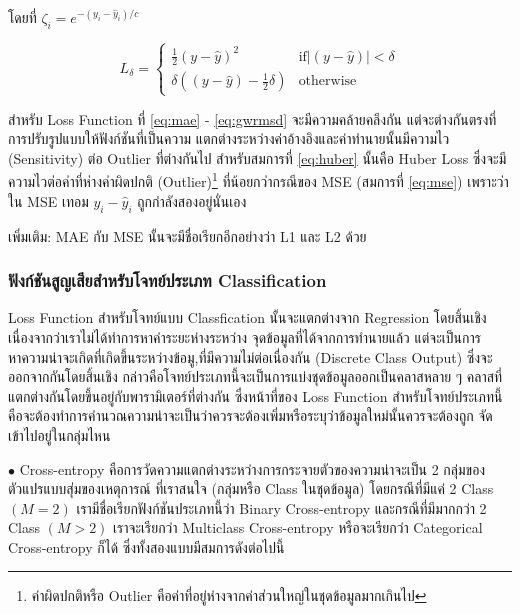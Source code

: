 \noindent โดยที่ $\zeta_{i} = e^{-(y_{i} - \hat{y}_{i}) / c}$

\begin{equation}\label{eq:huber}
    L_{\delta}=
    \left\{\begin{matrix}
        \frac{1}{2}(y - \hat{y})^{2} & \text{if} \left | (y - \hat{y})  \right | < \delta\\
        \delta ((y - \hat{y}) - \frac1 2 \delta) & \text{otherwise}
    \end{matrix}\right.
\end{equation}

สำหรับ Loss Function ที่ \ref{eq:mae} - \ref{eq:gwrmsd} จะมีความคล้ายคลึงกัน แต่จะต่างกันตรงที่การปรับรูปแบบให้ฟังก์ชันที่เป็นความ%
แตกต่างระหว่างค่าอ้างอิงและค่าทำนายนั้นมีความไว (Sensitivity) ต่อ Outlier ที่ต่างกันไป สำหรับสมการที่ \ref{eq:huber} นั้นคือ Huber
Loss ซึ่งจะมีความไวต่อค่าที่ห่างค่าผิดปกติ (Outlier)\footnote{ค่าผิดปกติหรือ Outlier คือค่าที่อยู่ห่างจากค่าส่วนใหญ่ในชุดข้อมูลมากเกินไป} 
ที่น้อยกว่ากรณีของ MSE (สมการที่ \ref{eq:mse}) เพราะว่าใน MSE เทอม $y_{i} - \hat{y}_{i}$ ถูกกำลังสองอยู่นั่นเอง

\noindent เพิ่มเติม: MAE กับ MSE นั้นจะมีชื่อเรียกอีกอย่างว่า L1 และ L2 ด้วย

\subsubsection{ฟังก์ชันสูญเสียสำหรับโจทย์ประเภท Classification}

Loss Function สำหรับโจทย์แบบ Classfication นั้นจะแตกต่างจาก Regression โดยสิ้นเชิงเนื่องจากว่าเราไม่ได้ทำการหาค่าระยะห่างระหว่าง%
จุดข้อมูลที่ได้จากการทำนายแล้ว แต่จะเป็นการหาความน่าจะเกิดที่เกิดขึ้นระหว่างข้อมู,ที่มีความไม่ต่อเนื่องกัน (Discrete Class Output) ซึ่งจะ%
ออกจากกันโดยสิ้นเชิง กล่าวคือโจทย์ประเภทนี้จะเป็นการแบ่งชุดข้อมูลออกเป็นคลาสหลาย ๆ คลาสที่แตกต่างกันโดยขึ้นอยู่กับพารามิเตอร์ที่ต่างกัน 
ซึ่งหน้าที่ของ Loss Function สำหรับโจทย์ประเภทนี้คือจะต้องทำการคำนวณความน่าจะเป็นว่าควรจะต้องเพิ่มหรือระบุว่าข้อมูลใหม่นั้นควรจะต้องถูก%
จัดเข้าไปอยู่ในกลุ่มไหน

\noindent $\bullet$ Cross-entropy คือการวัดความแตกต่างระหว่างการกระจายตัวของความน่าจะเป็น 2 กลุ่มของตัวแปรแบบสุ่มของเหตุการณ์%
ที่เราสนใจ (กลุ่มหรือ Class ในชุดข้อมูล) โดยกรณีที่มีแค่ 2 Class $(M = 2)$ เรามีชื่อเรียกฟังก์ชันประเภทนี้ว่า Binary Cross-entropy 
และกรณีที่มีมากกว่า 2 Class $(M > 2)$ เราจะเรียกว่า Multiclass Cross-entropy หรือจะเรียกว่า Categorical Cross-entropy ก็ได้ 
ซึ่งทั้งสองแบบมีสมการดังต่อไปนี้

